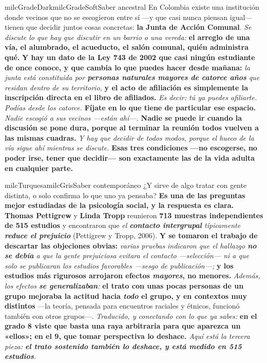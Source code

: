 \documentclass[11pt,letterpaper]{article}
\begin{document}
\begin{softbox}{milcGradeDark}{milcGradeSoft}{Saber ancestral}
En Colombia existe una institución donde vecinos que no se escogieron entre sí ---y que casi nunca piensan igual--- tienen que decidir juntos cosas concretas: \textbf{la Junta de Acción Comunal}. \emph{Se discute lo que hay que discutir en un barrio o una vereda:} \textbf{el arreglo de una vía, el alumbrado, el acueducto, el salón comunal, quién administra qué.} \textbf{Y hay un dato de la \textbf{Ley 743 de 2002} que casi ningún estudiante de once conoce, y que cambia lo que puedes hacer desde mañana:} \emph{la junta está constituida por \textbf{personas naturales mayores de catorce años} que residan dentro de su territorio,} \textbf{y el acto de afiliación es simplemente \textbf{la inscripción directa en el libro de afiliados}.} \emph{Es decir: tú ya puedes afiliarte. Podías desde los catorce.} \textbf{Fíjate en lo que tiene de particular ese espacio.} \emph{Nadie escogió a sus vecinos ---están ahí---.} \textbf{Nadie se puede ir cuando la discusión se pone dura, porque al terminar la reunión todos vuelven a las mismas cuadras.} \emph{Y hay que decidir de todos modos, porque el hueco de la vía sigue ahí mientras se discute.} \textbf{Esas tres condiciones ---no escogerse, no poder irse, tener que decidir--- son exactamente las de la vida adulta en cualquier parte.}
\end{softbox}

\begin{softbox}{milcTurquesa}{milcGris}{Saber contemporáneo}
¿Y sirve de algo tratar con gente distinta, o solo confirma lo que uno ya pensaba? \textbf{Es una de las preguntas mejor estudiadas de la psicología social, y la respuesta es clara.} \textbf{Thomas Pettigrew} y \textbf{Linda Tropp} reunieron \textbf{713 muestras independientes de 515 estudios} y encontraron que \emph{el \textbf{contacto intergrupal} típicamente \textbf{reduce el prejuicio}} (Pettigrew y Tropp, 2006). \textbf{Y se tomaron el trabajo de descartar las objeciones obvias:} \emph{varias pruebas indicaron que el hallazgo \textbf{no se debía} a que la gente prejuiciosa evitara el contacto ---selección--- ni a que solo se publicaran los estudios favorables ---sesgo de publicación---;} \textbf{y los estudios \textbf{más rigurosos} arrojaron efectos \emph{mayores}, no menores.} \emph{Además, los efectos \textbf{se generalizaban}:} \textbf{el trato con unas pocas personas de un grupo mejoraba la actitud hacia \emph{todo} el grupo, y en contextos muy distintos} ---la teoría, pensada para encuentros raciales y étnicos, funcionó también con otros grupos---. \emph{Traducido, y conectando con lo que ya sabes:} \textbf{en el grado 8 viste que basta una raya arbitraria para que aparezca un «ellos»; en el 9, que tomar perspectiva lo deshace.} \emph{Aquí está la tercera pieza: \textbf{el trato sostenido también lo deshace, y está medido en 515 estudios}.}
\end{softbox}
\end{document}
